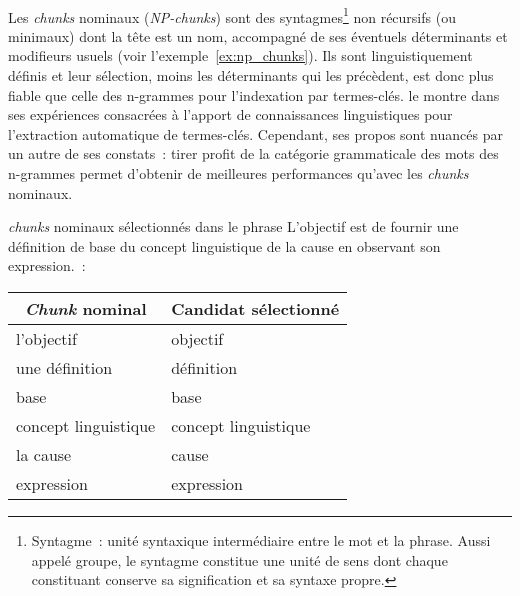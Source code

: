     ~\\Les \textit{chunks} nominaux
    (\textit{NP-chunks}) sont des syntagmes\footnote{Syntagme~: unité syntaxique
    intermédiaire entre le mot et la phrase. Aussi appelé groupe, le syntagme
    constitue une unité de sens dont chaque constituant conserve sa
    signification et sa syntaxe propre.} non récursifs (ou minimaux) dont la
    tête est un nom, accompagné de ses éventuels déterminants et modifieurs
    usuels (voir l'exemple~\ref{ex:np_chunks}). Ils sont linguistiquement
    définis et leur sélection, moins les déterminants qui les précèdent, est
    donc plus fiable que celle des n-grammes pour l'indexation par termes-clés.
     le montre dans ses expériences
    consacrées à l'apport de connaissances linguistiques pour l'extraction
    automatique de termes-clés. Cependant, ses propos sont nuancés par un autre
    de ses constats~: tirer profit de la catégorie grammaticale des mots des
    n-grammes permet d'obtenir de meilleures performances qu'avec les
    \textit{chunks} nominaux.

    \begin{example}\label{ex:np_chunks}
      \textit{chunks} nominaux sélectionnés dans le phrase \og{}L'objectif est
      de fournir une définition de base du concept linguistique de la cause en
      observant son expression.\fg{}~:
      \begin{center}
        \begin{tabular}{l|l}
          \toprule
          \multicolumn{1}{c|}{\textbf{\textit{Chunk} nominal}} & \multicolumn{1}{c}{\textbf{Candidat sélectionné}}\\
          \hline
          \og{}l'objectif\fg{} & \og{}objectif\fg{}\\
          \og{}une définition\fg{} & \og{}définition\fg{}\\
          \og{}base\fg{} & \og{}base\fg{}\\
          \og{}concept linguistique\fg{} & \og{}concept linguistique\fg{}\\
          \og{}la cause\fg{} & \og{}cause\\
          \og{}expression\fg{} & \og{}expression\fg{}\\
          \bottomrule
        \end{tabular}
      \end{center}\vspace{.25em}
    \end{example}

